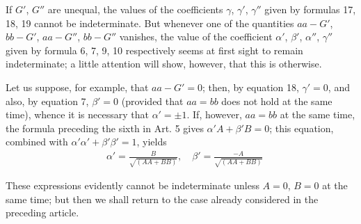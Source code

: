 
If $G'$, $G''$ are unequal, the values of the coefficients $\gamma$, $\gamma'$, $\gamma''$ given by formulas 17, 18, 19 cannot be indeterminate. But whenever one of the quantities
\noindent{}
$aa-G'$, $bb-G'$, $aa-G''$, $bb-G''$ vanishes, the value of the coefficient $\alpha'$, $\beta'$, $\alpha''$, $\gamma''$ given by formula 6, 7, 9, 10 respectively seems at first sight to remain indeterminate; a little attention will show, however, that this is otherwise.

Let us suppose, for example, that $aa-G'=0$; then, by equation 18, $\gamma'=0$, and also, by equation 7, $\beta'=0$ (provided that $aa=bb$ does not hold at the same time), whence it is necessary that $\alpha'=\pm1$. If, however, $aa=bb$ at the same time, the formula preceding the sixth in Art. 5 gives $\alpha'A+\beta'B=0$; this equation, combined with $\alpha'\alpha'+\beta'\beta'=1$, yields
\[
\begin{aligned}
&\alpha'=\frac{B}{\surd{(AA+BB)}},\quad
\beta'=\frac{-A}{\surd{(AA+BB)}}
\end{aligned}
\]
\par These expressions evidently cannot be indeterminate unless $A=0$, $B=0$ at the same time; but then we shall return to the case already considered in the preceding article.

\clearpage
\endgroup
